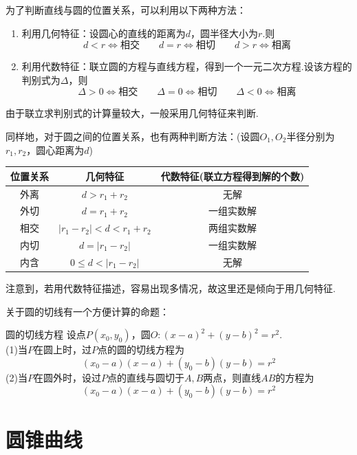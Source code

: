 \documentclass[lang=cn, zihao=5]{elegantbook}
\begin{document}
为了判断直线与圆的位置关系，可以利用以下两种方法：

\begin{enumerate}
	\item 利用几何特征：设圆心的直线的距离为$d$，圆半径大小为$r$.则$$d<r \Longleftrightarrow \textit{相交} \qquad d=r \Longleftrightarrow \textit{相切} \qquad d>r \Longleftrightarrow \textit{相离}$$
	\item 利用代数特征：联立圆的方程与直线方程，得到一个一元二次方程.设该方程的判别式为$\Delta$，则$$\Delta > 0 \Longleftrightarrow \textit{相交} \qquad \Delta = 0 \Longleftrightarrow \textit{相切} \qquad \Delta < 0 \Longleftrightarrow \textit{相离}$$
\end{enumerate}

由于联立求判别式的计算量较大，一般采用几何特征来判断.

同样地，对于圆之间的位置关系，也有两种判断方法：(设圆$O_1,O_2$半径分别为$r_1,r_2$，圆心距离为$d$)

\begin{table}[h]
	\centering
	\renewcommand\arraystretch{1.5}
	\begin{tabular}{c|cc}
		\toprule
		位置关系&几何特征&代数特征(联立方程得到解的个数) \\
		\midrule
		外离 & $d>r_1+r_2$ & 无解 \\
		外切 & $d=r_1+r_2$ & 一组实数解 \\
		相交 & $|r_1-r_2|<d<r_1+r_2$ & 两组实数解 \\
		内切 & $d=|r_1-r_2|$ & 一组实数解 \\
		内含 & $0 \leq d < |r_1-r_2|$ & 无解 \\
		\bottomrule
	\end{tabular}
\end{table}

注意到，若用代数特征描述，容易出现多情况，故这里还是倾向于用几何特征.

关于圆的切线有一个方便计算的命题：

\begin{proposition}{圆的切线方程}
	设点$P(x_0,y_0)$，圆$O:(x-a)^2+(y-b)^2=r^2$. \\
	(1)当$P$在圆上时，过$P$点的圆的切线方程为$$(x_0-a)(x-a)+(y_0-b)(y-b)=r^2$$
	(2)当$P$在圆外时，设过$P$点的直线与圆切于$A,B$两点，则直线$AB$的方程为$$(x_0-a)(x-a)+(y_0-b)(y-b)=r^2$$
\end{proposition}

\section{圆锥曲线}
\end{document}
